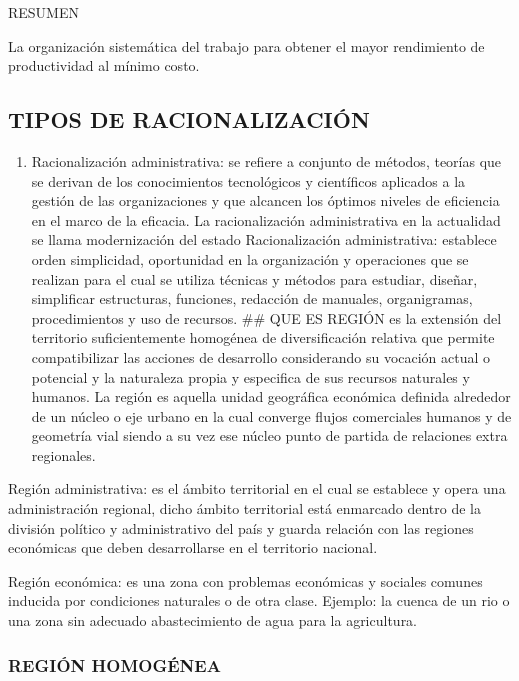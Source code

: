 \documentclass[
  a4paper,
]{article}
\providecommand{\tightlist}{%
  \setlength{\itemsep}{0pt}\setlength{\parskip}{0pt}}\usepackage{longtable,booktabs,array}
\begin{document}
RESUMEN

La organización sistemática del trabajo para obtener el mayor
rendimiento de productividad al mínimo costo.

\hypertarget{tipos-de-racionalizaciuxf3n}{%
\subsection{TIPOS DE
RACIONALIZACIÓN}\label{tipos-de-racionalizaciuxf3n}}

\begin{enumerate}
\def\labelenumi{\arabic{enumi}.}
\tightlist
\item
  Racionalización administrativa: se refiere a conjunto de métodos,
  teorías que se derivan de los conocimientos tecnológicos y científicos
  aplicados a la gestión de las organizaciones y que alcancen los
  óptimos niveles de eficiencia en el marco de la eficacia. La
  racionalización administrativa en la actualidad se llama modernización
  del estado Racionalización administrativa: establece orden
  simplicidad, oportunidad en la organización y operaciones que se
  realizan para el cual se utiliza técnicas y métodos para estudiar,
  diseñar, simplificar estructuras, funciones, redacción de manuales,
  organigramas, procedimientos y uso de recursos. \#\# QUE ES REGIÓN es
  la extensión del territorio suficientemente homogénea de
  diversificación relativa que permite compatibilizar las acciones de
  desarrollo considerando su vocación actual o potencial y la naturaleza
  propia y especifica de sus recursos naturales y humanos. La región es
  aquella unidad geográfica económica definida alrededor de un núcleo o
  eje urbano en la cual converge flujos comerciales humanos y de
  geometría vial siendo a su vez ese núcleo punto de partida de
  relaciones extra regionales.
\end{enumerate}

Región administrativa: es el ámbito territorial en el cual se establece
y opera una administración regional, dicho ámbito territorial está
enmarcado dentro de la división político y administrativo del país y
guarda relación con las regiones económicas que deben desarrollarse en
el territorio nacional.

Región económica: es una zona con problemas económicas y sociales
comunes inducida por condiciones naturales o de otra clase. Ejemplo: la
cuenca de un rio o una zona sin adecuado abastecimiento de agua para la
agricultura.

\hypertarget{regiuxf3n-homoguxe9nea}{%
\subsubsection{REGIÓN HOMOGÉNEA}\label{regiuxf3n-homoguxe9nea}}
\end{document}
